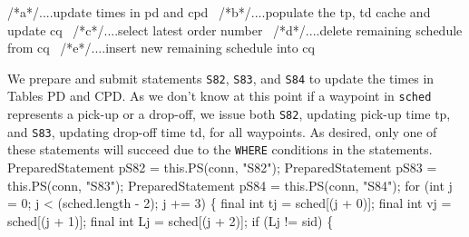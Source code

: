 \documentclass{article}
\def\nwendcode{\endtrivlist \endgroup}      %
\let\nwdocspar=\par
\theoremstyle{definition}                   %
\begin{document}
\nwenddocs{}\endmoddef{}
/*a*/\LA{}....update times in pd and cpd~{\nwtagstyle{}}\RA{}
\nwendcode{}
\nwenddocs{}\plusendmoddef
/*b*/\LA{}....populate the tp, td cache and update cq~{\nwtagstyle{}}\RA{}
/*c*/\LA{}....select latest order number~{\nwtagstyle{}}\RA{}
/*d*/\LA{}....delete remaining schedule from cq~{\nwtagstyle{}}\RA{}
/*e*/\LA{}....insert new remaining schedule into cq~{\nwtagstyle{}}\RA{}
\nwendcode{}\nwdocspar
{\small We prepare and submit statements {\tt{}\protect{}\protect{}S82}, {\tt{}\protect{}S83}, and {\tt{}\protect{}S84} to
update the times in Tables PD and CPD. As we don't know at this point if a
waypoint in {\tt{}sched} represents a pick-up or a drop-off, we issue both
{\tt{}\protect{}S82}, updating pick-up time \textsf{tp}, and {\tt{}\protect{}S83}, updating drop-off time
\textsf{td}, for all waypoints. As desired, only one of these statements will
succeed due to the {\tt{}WHERE} conditions in the statements.}
\nwenddocs{}\endmoddef{}
PreparedStatement pS82 = this.PS(conn, "S82");
PreparedStatement pS83 = this.PS(conn, "S83");
PreparedStatement pS84 = this.PS(conn, "S84");
for (int j = 0; j < (sched.length - 2); j += 3) \{
  final int tj = sched[(j + 0)];
  final int vj = sched[(j + 1)];
  final int Lj = sched[(j + 2)];
  if (Lj != sid) \{
\end{document}
